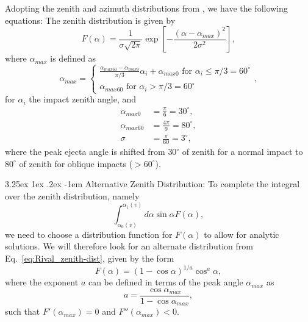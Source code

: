 \documentclass{hitec}
\makeatletter
\renewcommand\paragraph{\@startsection{paragraph}{5}{\z@}%
	{3.25ex \@plus1ex \@minus.2ex}%
	{-1em}%
	{\normalfont\normalsize\bfseries}}
\makeatother
\begin{document}
Adopting the zenith and azimuth distributions from \cite{rival1999modeling}, we have the following equations:
The zenith distribution is given by
\begin{equation}\label{eq:Rival_zenith-dist}
F(\alpha) = \frac{1}{\sigma\sqrt{2\pi}}\exp\left[-\frac{(\alpha-\alpha_{max})^2}{2\sigma^2}\right],
\end{equation}
where $\alpha_{max}$ is defined as
\begin{equation}
\alpha_{max} = 
\begin{cases}
\frac{\alpha_{max60}-\alpha_{max0}}{\pi/3}\alpha_i + \alpha_{max0}\text{  for $\alpha_i\le \pi/3 = 60^\circ$}\\
\alpha_{max60}\text{  for $\alpha_i > \pi/3 = 60^\circ$}
\end{cases},
\end{equation}
for $\alpha_i$ the impact zenith angle, and \citep[see][]{ESABASE2_DebrisRelease10.0}
\begin{align}
\alpha_{max0} &= \frac{\pi}{6} = 30^\circ,\\
\alpha_{max60} &= \frac{4\pi}{9} = 80^\circ,\\
\sigma &= \frac{\pi}{60} = 3^\circ,
\end{align}
where the peak ejecta angle is shifted from $30^\circ$ of zenith for a normal impact to $80^\circ$ of zenith for oblique impacts ($>60^\circ$).

\paragraph{Alternative Zenith Distribution:}
To complete the integral over the zenith distribution, namely
\begin{equation}\label{eq:zenith_integral}
\int_{\alpha_0(v)}^{\alpha_1(v)}d\alpha\sin\alpha F(\alpha),
\end{equation}
we need to choose a distribution function for $F(\alpha)$ to allow for analytic solutions. We will therefore look for an alternate distribution from Eq.\ \eqref{eq:Rival_zenith-dist}, given by the form
\begin{equation}
F(\alpha) = (1-\cos\alpha)^{1/a}\cos^a\alpha,
\end{equation}
where the exponent $a$ can be defined in terms of the peak angle $\alpha_{max}$ as
\begin{equation}
a = \frac{\cos\alpha_{max}}{1-\cos\alpha_{max}},
\end{equation}
such that $F'(\alpha_{max}) = 0$ and $F''(\alpha_{max}) < 0$.
\end{document}
